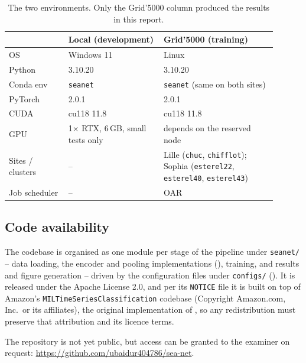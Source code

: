 \begin{table}[htbp]
\caption{The two environments. Only the Grid'5000 column produced the results in this report.}
\label{tab:environment}
\begin{center}
\small
\begin{tabular}{p{0.20\linewidth} p{0.32\linewidth} p{0.38\linewidth}}
\toprule
 & \textbf{Local (development)} & \textbf{Grid'5000 (training)} \\
\midrule
OS              & Windows 11 & Linux \\
Python          & 3.10.20 & 3.10.20 \\
Conda env       & \texttt{seanet} & \texttt{seanet} (same on both sites) \\
PyTorch         & 2.0.1 & 2.0.1 \\
CUDA            & cu118 11.8 & cu118 11.8 \\
GPU             & 1$\times$ RTX, 6\,GB, small tests only & depends on the reserved node \\
Sites / clusters & -- & Lille (\texttt{chuc}, \texttt{chifflot}); Sophia
                        (\texttt{esterel22}, \texttt{esterel40}, \texttt{esterel43}) \\
Job scheduler   & --   & OAR \\
\bottomrule
\end{tabular}
\end{center}
\end{table}

\subsection{Code availability}
\label{app:code}

The codebase is organised as one module per stage of the pipeline under \texttt{seanet/} -- data
loading, the encoder and pooling implementations (), training, and results and
figure generation -- driven by the configuration files under \texttt{configs/} ().
It is released under the Apache License 2.0, and per its \texttt{NOTICE} file it is built on top of
Amazon's \texttt{MILTimeSeriesClassification} codebase (Copyright Amazon.com, Inc.\ or its
affiliates), the original implementation of \millet{} \citep{early2024millet}, so any redistribution
must preserve that attribution and its licence terms.

The repository is not yet public, but access can be granted to the examiner on request:
\url{https://github.com/ubaidur404786/sea-net}.
